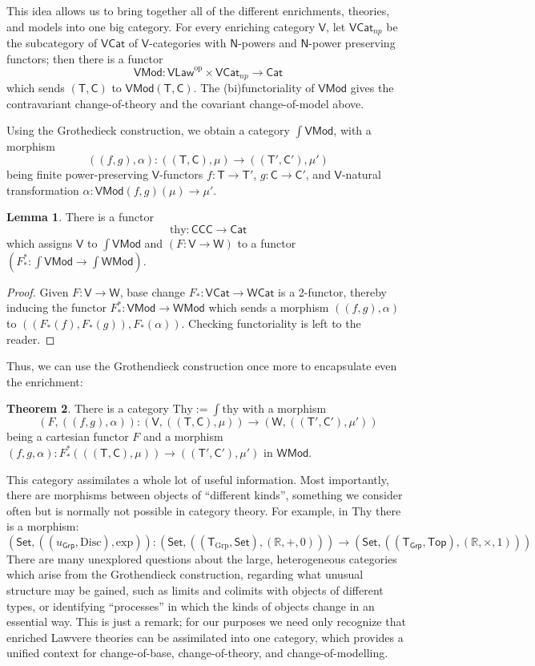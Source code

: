 \documentclass{amsart}
\theoremstyle{definition}
\newtheorem{theorem}{Theorem}
\newtheorem{lemma}[theorem]{Lemma}
\newcommand{\Set}{\mathsf{Set}}
\newcommand{\Grp}{\mathsf{Grp}}
\newcommand{\Cat}{\mathsf{Cat}}
\newcommand{\Law}{\mathsf{Law}}
\newcommand{\Top}{\mathsf{Top}}
\newcommand{\CCC}{\mathsf{CCC}}
\newcommand{\Mod}{\mathsf{Mod}}
\newcommand{\NN}{\mathsf{N}}
\newcommand{\V}{\mathsf{V}}
\newcommand{\W}{\mathsf{W}}
\newcommand{\C}{\mathsf{C}}
\newcommand{\T}{\mathsf{T}}
\newcommand{\op}{\mathrm{op}}
\newcommand{\maps}{\colon}
\begin{document}
This idea allows us to bring together all of the different enrichments, theories, and models into one big category. For every enriching category $\V$, let $\V\Cat_{np}$ be the subcategory of $\V\Cat$ of $\V$-categories with $\NN$-powers and $\NN$-power preserving functors; then there is a functor $$\V\Mod\maps \V\Law^\op \times \V\Cat_{np} \to \Cat$$ which sends $(\T,\C)$ to $\V\Mod(\T,\C)$. The (bi)functoriality of $\V\Mod$ gives the contravariant change-of-theory and the covariant change-of-model above.

Using the Grothedieck construction, we obtain a category \textbf{$\int \V\Mod$}, with a morphism $$((f,g),\alpha)\maps ((\T,\C),\mu) \to ((\T',\C'),\mu')$$ being finite power-preserving $\V$-functors $f\maps\T\to \T'$, $g\maps\C\to \C'$, and $\V$-natural transformation $\alpha\maps\V\Mod(f,g)(\mu)\to \mu'$.

\begin{lemma}
	There is a functor $$\mathrm{thy}\maps \CCC \to \Cat$$ which assigns $\V$ to $\int \V\Mod$ and $(F\maps \V \to \W)$ to a functor $(F_*^*\maps \int \V\Mod \to \int \W\Mod)$.
\end{lemma}
\begin{proof}
	Given $F\maps\V\to \W$, base change $F_*\maps \V\Cat \to \W\Cat$ is a 2-functor, thereby inducing the functor $F_*^*\maps\V\Mod\to \W\Mod$ which sends a morphism $((f,g),\alpha)$ to $((F_*(f),F_*(g)),F_*(\alpha))$. Checking functoriality is left to the reader.
\end{proof}

Thus, we can use the Grothendieck construction once more to encapsulate even the enrichment:
\begin{theorem}
	There is a category $\mathrm{Thy} := \int \mathrm{thy}$ with a morphism $$(F,((f,g),\alpha))\maps (\V,((\T,\C),\mu)) \to (\W,((\T',\C'),\mu'))$$ being a cartesian functor $F$ and a morphism $(f,g,\alpha)\maps F_*^*(((\T,\C),\mu)) \to ((\T',\C'),\mu')$ in $\W\Mod$.
\end{theorem}

This category assimilates a whole lot of useful information. Most importantly, there are morphisms between objects of ``different kinds'', something we consider often but is normally not possible in category theory. For example, in $\mathrm{Thy}$ there is a morphism: 
\[ (\Set, ((u_{\Grp}, \mathrm{Disc}), \mathrm{exp}))\maps (\Set,((\T_{\mathrm{Grp}},\Set),(\mathbb{R},+,0))) \to (\Set,((\T_\Grp,\Top),(\mathbb{R},\times,1))) \]
There are many unexplored questions about the large, heterogeneous categories which arise from the Grothendieck construction, regarding what unusual structure may be gained, such as limits and colimits with objects of different types, or identifying ``processes'' in which the kinds of objects change in an essential way. This is just a remark; for our purposes we need only recognize that enriched Lawvere theories can be assimilated into one category, which provides a unified context for change-of-base, change-of-theory, and change-of-modelling.
\end{document}
